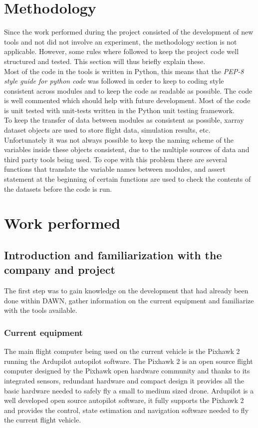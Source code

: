 \section{Methodology}
Since the work performed during the project consisted of the development of new tools and not did not involve an experiment, the methodology section is not applicable. However, some rules where followed to keep the project code well structured and tested. This section will thus briefly explain these. \\

Most of the code in the tools is written in Python, this means that the \textit{PEP-8 style guide for python code} was followed in order to keep to coding style consistent across modules and to keep the code as readable as possible. The code is well commented which should help with future development. Most of the code is unit tested with unit-tests written in the Python unit testing framework. \\

To keep the transfer of data between modules as consistent as possible, xarray dataset objects are used to store flight data, simulation results, etc. Unfortunately it was not always possible to keep the naming scheme of the variables inside these objects consistent, due to the multiple sources of data and third party tools being used. To cope with this problem there are several functions that translate the variable names between modules, and assert statement at the beginning of certain functions are used to check the contents of the datasets before the code is run. \\

\section{Work performed}
\subsection{Introduction and familiarization with the company and project}
The first step was to gain knowledge on the development that had already been done within DAWN, gather information on the current equipment and familiarize with the tools available.

\subsubsection{Current equipment}
The main flight computer being used on the current vehicle is the Pixhawk 2 running the Ardupilot autopilot software. The Pixhawk 2 is an open source flight computer designed by the Pixhawk open hardware community and thanks to its integrated sensors, redundant hardware and compact design it provides all the basic hardware needed to safely fly a small to medium sized drone. Ardupilot is a well developed open source autopilot software, it fully supports the Pixhawk 2 and provides the control, state estimation and navigation software needed to fly the current flight vehicle.

